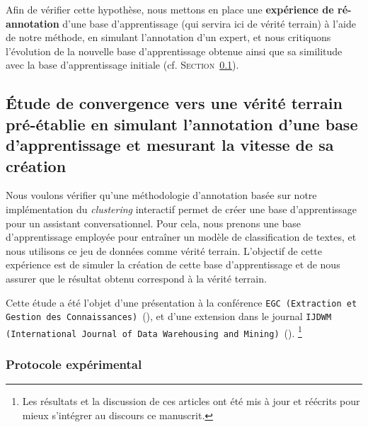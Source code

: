 	Afin de vérifier cette hypothèse, nous mettons en place une \textbf{expérience de ré-annotation} d'une base d'apprentissage (qui servira ici de vérité terrain) à l'aide de notre méthode, en simulant l'annotation d'un expert, et nous critiquons l'évolution de la nouvelle base d'apprentissage obtenue ainsi que sa similitude avec la base d'apprentissage initiale (cf. \textsc{Section~\ref{section:4.1.1-ETUDE-CONVERGENCE}}).
	
	
	\subsection{Étude de convergence vers une vérité terrain pré-établie en simulant l'annotation d'une base d'apprentissage et mesurant la vitesse de sa création}
	\label{section:4.1.1-ETUDE-CONVERGENCE}
		
		Nous voulons vérifier qu'une méthodologie d'annotation basée sur notre implémentation du \textit{clustering} interactif permet de créer une base d'apprentissage pour un assistant conversationnel.
		Pour cela, nous prenons une base d'apprentissage employée pour entraîner un modèle de classification de textes, et nous utilisons ce jeu de données comme vérité terrain.
		L'objectif de cette expérience est de simuler la création de cette base d'apprentissage et de nous assurer que le résultat obtenu correspond à la vérité terrain.
			
		\begin{leftBarInformation}
			Cette étude a été l'objet d'une présentation à la conférence \texttt{EGC (Extraction et Gestion des Connaissances)}~(\cite{schild-etal:2021:conception-iterative-semisupervisee}), et d'une extension dans le journal \texttt{IJDWM (International Journal of Data Warehousing and Mining)}~(\cite{schild-etal:2022:iterative-semisupervised-design}).
			\footnote{Les résultats et la discussion de ces articles ont été mis à jour et réécrits pour mieux s'intégrer au discours ce manuscrit.}
		\end{leftBarInformation}

		\subsubsection{Protocole expérimental}
			
